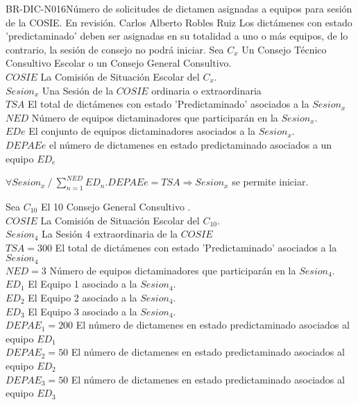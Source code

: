 \begin{BusinessRule}{BR-DIC-N016}{Número de solicitudes de dictamen asignadas a equipos para sesión de la COSIE.}
	{\bcCondition}    %
	{\btEnabler}     %
	{\blControlling}    %
	\BRItem[Estado] En revisión.
	 Carlos Alberto Robles Ruiz
	\BRItem[Descripción] Los dictámenes con estado 'predictaminado'  deben ser asignadas en su totalidad a uno o más equipos, de lo contrario, la sesión de consejo no podrá iniciar.
	\BRItem[Sentencia] Sea $ C_{x}$ Un Consejo Técnico Consultivo Escolar o un Consejo General Consultivo.\\
	$COSIE$ La Comisión de Situación Escolar del $ C_{x}$.\\
	$Sesion_{x}$ Una Sesión de la $COSIE$ ordinaria o extraordinaria\\
	$TSA$ El total de dictámenes con estado 'Predictaminado' asociados a la $Sesion_{x}$\\
	$NED$ Número de equipos dictaminadores que participarán en la $Sesion_{x}$.\\
	$ ED{e} $ El conjunto de equipos dictaminadores asociados a la $Sesion_{x}$.\\
	$DEPAE{e}$ el número de dictamenes en estado predictaminado asociados a un equipo $ED_{e}$\\


	\begin{center}
		$ \forall Sesion_{x}  \: /  \:  \sum_{n=1}^{NED}ED_{n}.DEPAE{e}= TSA \Rightarrow Sesion_{x} $ se permite iniciar.
	\end{center}
	
	
 Sea $ C_{10}$ El 10 Consejo General Consultivo .\\
$COSIE$ La Comisión de Situación Escolar del $ C_{10}$.\\
$Sesion_{4}$ La Sesión 4 extraordinaria de la $COSIE$\\
$TSA=300$ El total de dictámenes con estado 'Predictaminado' asociados a la $Sesion_{4}$\\
$NED= 3$ Número de equipos dictaminadores que participarán en la $Sesion_{4}$.\\
$ ED_{1}$ El Equipo 1 asociado a la $Sesion_{4}$.\\
$ ED_{2}$ El Equipo 2 asociado a la $Sesion_{4}$.\\
$ ED_{3}$ El Equipo 3 asociado a la $Sesion_{4}$.\\
$DEPAE_{1}= 200 $ El número de dictamenes en estado predictaminado asociados al equipo $ED_{1}$\\
$DEPAE_{2}= 50 $ El número de dictamenes en estado predictaminado asociados al equipo $ED_{2}$\\
$DEPAE_{3}= 50 $ El número de dictamenes en estado predictaminado asociados al equipo $ED_{3}$\\


\end{BusinessRule}
